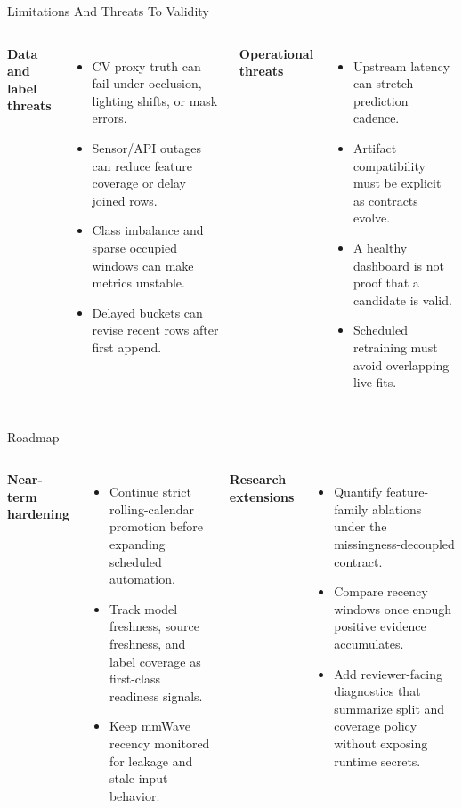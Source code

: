 \documentclass[aspectratio=169]{beamer}
\begin{document}
\begin{frame}[shrink=4]{Limitations And Threats To Validity}
\begin{columns}[T,onlytextwidth]
\textbf{Data and label threats}
\begin{itemize}
  \item CV proxy truth can fail under occlusion, lighting shifts, or mask errors.
  \item Sensor/API outages can reduce feature coverage or delay joined rows.
  \item Class imbalance and sparse occupied windows can make metrics unstable.
  \item Delayed buckets can revise recent rows after first append.
\end{itemize}

\textbf{Operational threats}
\begin{itemize}
  \item Upstream latency can stretch prediction cadence.
  \item Artifact compatibility must be explicit as contracts evolve.
  \item A healthy dashboard is not proof that a candidate is valid.
  \item Scheduled retraining must avoid overlapping live fits.
\end{itemize}
\end{columns}
\end{frame}

\begin{frame}[shrink=4]{Roadmap}
\begin{columns}[T,onlytextwidth]
\textbf{Near-term hardening}
\begin{itemize}
  \item Continue strict rolling-calendar promotion before expanding scheduled automation.
  \item Track model freshness, source freshness, and label coverage as first-class readiness signals.
  \item Keep mmWave recency monitored for leakage and stale-input behavior.
\end{itemize}

\textbf{Research extensions}
\begin{itemize}
  \item Quantify feature-family ablations under the missingness-decoupled contract.
  \item Compare recency windows once enough positive evidence accumulates.
  \item Add reviewer-facing diagnostics that summarize split and coverage policy without exposing runtime secrets.
\end{itemize}
\end{columns}
\end{frame}
\end{document}
